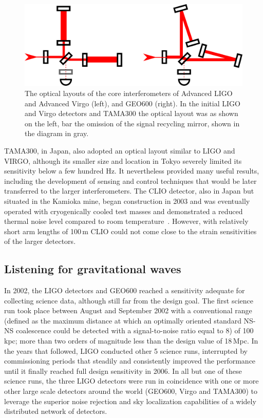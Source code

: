 \begin{figure}[htb]
	\includegraphics[width=\textwidth]{detector_layouts.pdf}
	\caption{\label{fig:detector_layouts}
		The optical layouts of the core interferometers of Advanced LIGO and Advanced Virgo (left), and GEO600 (right). 
		In the initial LIGO and Virgo detectors and TAMA300 the optical layout was as shown on the left, bar the omission of the 
signal recycling mirror, shown in the diagram in gray.}
\end{figure}

TAMA300\cite{Ando_2002}, in Japan, also adopted an optical layout similar to LIGO and VIRGO, although its smaller size and location in Tokyo severely limited its sensitivity below a few hundred Hz.
It nevertheless provided many useful results, including the development of sensing and control techniques that would be later transferred to the larger interferometers. 
The CLIO detector, also in Japan but situated in the Kamioka mine, began construction in 2003 and was eventually operated with cryogenically cooled test masses and demonstrated a reduced thermal noise level compared to room temperature~\cite{Uchiyama_2012}. However, with relatively short arm lengths of 100\,m CLIO could not come close to the strain sensitivities of the larger detectors.

\subsection{Listening for gravitational waves}
In 2002, the LIGO detectors and GEO600 reached a sensitivity adequate for collecting science data, although still far from the design goal.
The first science run took place between August and September 2002 with a conventional range (defined as the maximum distance at which an optimally oriented standard NS-NS coalescence could be detected with a signal-to-noise ratio equal to 8) of 100\,kpc; more than two orders of magnitude less than the design value of 18\,Mpc.
In the years that followed, LIGO conducted other 5 science runs, interrupted by commissioning periods that steadily and consistently improved the performance until it finally reached full design sensitivity in 2006.
In all but one of these science runs, the three LIGO detectors were run in coincidence with one or more other large scale detectors around the world (GEO600, Virgo and TAMA300) to leverage the superior noise rejection and sky localization capabilities of a widely distributed network of detectors\cite{Abbott_2004,Abbott_2005,Abbott_2006,Abbott_2008,Abadie_2010}.

